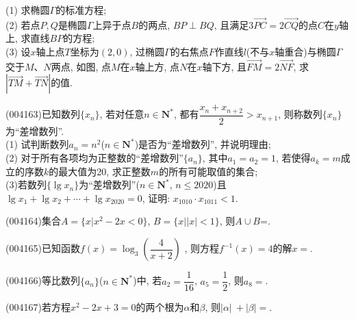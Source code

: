 \begin{center}
\end{center}
(1) 求椭圆$\Gamma$的标准方程;\\
(2) 若点$P,Q$是椭圆$\Gamma$上异于点$B$的两点, $BP\perp BQ$, 且满足$3\overrightarrow {PC}=2\overrightarrow {CQ}$的点$C$在$y$轴上, 求直线$BP$的方程;\\
(3) 设$x$轴上点$T$坐标为$(2,0)$, 过椭圆$\Gamma$的右焦点$F$作直线$l$(不与$x$轴重合)与椭圆$\Gamma$交于$M$、$N$两点, 如图, 点$M$在$x$轴上方, 点$N$在$x$轴下方, 且$\overrightarrow {FM}=2\overrightarrow {NF}$, 求$|\overrightarrow {TM}+\overrightarrow {TN}|$的值.
\item (004163)已知数列$\{x_n\}$, 若对任意$n\in \mathbf{N}^*$, 都有$\dfrac{x_n+x_{n+2}}2>x_{n+1}$, 则称数列$\{x_n\}$为``差增数列''.\\
(1) 试判断数列$a_n=n^2$($n\in \mathbf{N}^*$)是否为``差增数列'', 并说明理由;\\
(2) 对于所有各项均为正整数的``差增数列''$\{a_n\}$, 其中$a_1=a_2=1$, 若使得$a_k=m$成立的序数$k$的最大值为$20$, 求正整数$m$的所有可能取值的集合;\\
(3)若数列$\{\lg x_n\}$为``差增数列''($n\in \mathbf{N}^*$, $n\le 2020$)且$\lg x_1+\lg x_2+\cdots +\lg x_{2020}=0$, 证明: $x_{1010}\cdot x_{1011}<1$.
\item (004164)集合$A=\{x|x^2-2x<0\}$, $B=\{x||x|<1\}$, 则$A\cup B$=.
\item (004165)已知函数$f(x)=\log_3(\dfrac 4{x+2})$ , 则方程$f^{-1}(x)=4$的解$x=$.
\item (004166)等比数列$\{a_n\}$($n\in \mathbf{N}^*$)中, 若$a_2=\dfrac 1{16}$, $a_5=\dfrac 12$, 则$a_8=$.
\item (004167)若方程$x^2-2x+3=0$的两个根为$\alpha$和$\beta$, 则$|\alpha |\ +|\beta |=$.
